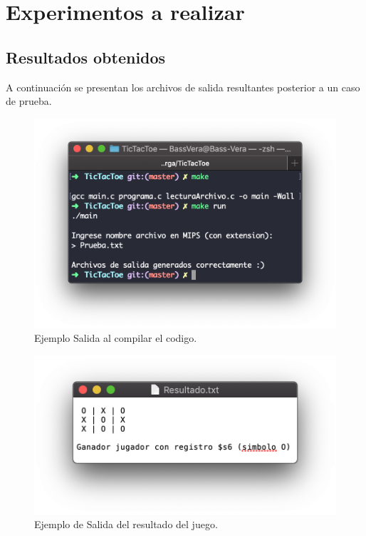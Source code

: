 \section{Experimentos a realizar}


\subsection{Resultados obtenidos}
\noindent A continuación se presentan los archivos de salida resultantes posterior a un caso de prueba.
\begin{figure}[H]
	\centering
	\includegraphics[scale=0.5]{images/compilacion.png}
	\caption{Ejemplo Salida al compilar el codigo.}
	\label{fig:ej1}
\end{figure}

\begin{figure}[H]
	\centering
	\includegraphics[scale=0.5]{images/resultado.png}
	\caption{Ejemplo de Salida del resultado del juego.}
	\label{fig:ej2}
\end{figure}

